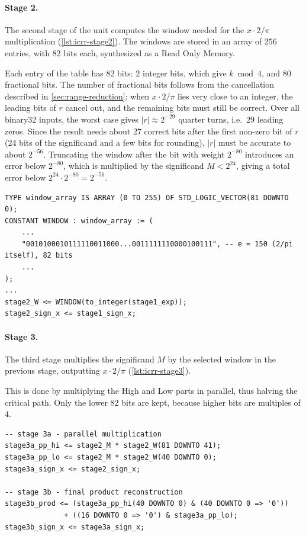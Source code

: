 \vspace{-6pt}
\paragraph{Stage 2.}
The second stage of the unit computes the window needed for the $x \cdot 2/\pi$ multiplication (\cref{lst:icrr-stage2}).
The windows are stored in an array of $256$ entries, with $82$ bits each, synthesized as a
Read Only Memory.

Each entry of the table has 82 bits: 2 integer bits, which give $k \bmod 4$, and 80
fractional bits. The number of fractional bits follows from the cancellation described in
\cref{sec:range-reduction}: when $x \cdot 2/\pi$ lies very close to an integer, the leading
bits of $r$ cancel out, and the remaining bits must still be correct. Over all binary32
inputs, the worst case gives $|r| \approx 2^{-29}$ quarter turns, i.e.\ 29 leading zeros.
Since the result needs about 27 correct bits after the first non-zero bit of $r$ (24 bits of
the significand and a few bits for rounding), $|r|$ must be accurate to about $2^{-56}$.
Truncating the window after the bit with weight $2^{-80}$ introduces an error below
$2^{-80}$, which is multiplied by the significand $M < 2^{24}$, giving a total error below
$2^{24} \cdot 2^{-80} = 2^{-56}$.

\begin{lstlisting}[caption = {Second stage -- window selection}, label = {lst:icrr-stage2}]
TYPE window_array IS ARRAY (0 TO 255) OF STD_LOGIC_VECTOR(81 DOWNTO 0);
CONSTANT WINDOW : window_array := (
    ...
    "0010100010111110011000...0011111110000100111", -- e = 150 (2/pi itself), 82 bits
    ...
);
...
stage2_W <= WINDOW(to_integer(stage1_exp));
stage2_sign_x <= stage1_sign_x;
\end{lstlisting}

\newpage

\paragraph{Stage 3.}
The third stage multiplies the significand $M$ by the selected window in the previous
stage, outputting $x \cdot 2/\pi$ (\cref{lst:icrr-stage3}).

This is done by multiplying the High and Low parts
in parallel, thus halving the critical path. Only the lower $82$ bits are kept,
because higher bits are multiples of $4$.

\begin{lstlisting}[caption = {Third stage -- multiplication}, label = {lst:icrr-stage3}]
-- stage 3a - parallel multiplication
stage3a_pp_hi <= stage2_M * stage2_W(81 DOWNTO 41);
stage3a_pp_lo <= stage2_M * stage2_W(40 DOWNTO 0);
stage3a_sign_x <= stage2_sign_x;

-- stage 3b - final product reconstruction
stage3b_prod <= (stage3a_pp_hi(40 DOWNTO 0) & (40 DOWNTO 0 => '0'))
              + ((16 DOWNTO 0 => '0') & stage3a_pp_lo);
stage3b_sign_x <= stage3a_sign_x;
\end{lstlisting}


